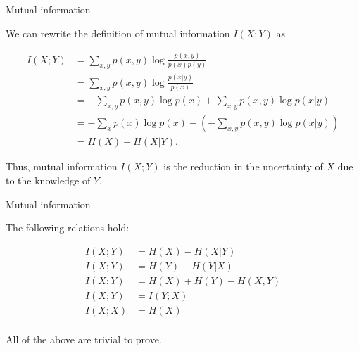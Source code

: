\documentclass[11pt,compress,t,notes=noshow, xcolor=table]{beamer}
\begin{document}
\begin{vbframe} {Mutual information}

We can rewrite the definition of mutual information $I(X;Y)$ as

\begin{equation*}\begin{aligned}
I(X ; Y) &=\sum_{x, y} p(x, y) \log \frac{p(x, y)}{p(x) p(y)} \\
&=\sum_{x, y} p(x, y) \log \frac{p(x | y)}{p(x)} \\
&=-\sum_{x, y} p(x, y) \log p(x)+\sum_{x, y} p(x, y) \log p(x | y) \\
&=-\sum_{x} p(x) \log p(x)-\left(-\sum_{x, y} p(x, y) \log p(x | y)\right) \\
&=H(X)-H(X | Y).
\end{aligned}\end{equation*}

Thus, mutual information $I(X;Y)$ is the reduction in the uncertainty
of $X$ due to the knowledge of $Y$.

\end{vbframe}

\begin{vbframe} {Mutual information}

The following relations hold:

\begin{equation*}
\begin{aligned}
I(X ; Y) &= H(X) - H(X | Y) \\
I(X ; Y) &= H(Y) - H(Y | X) \\
I(X ; Y) &= H(X) + H(Y) - H(X, Y) \\
I(X ; Y) &= I(Y ; X) \\
I(X ; X) &= H(X)\\
\end{aligned}
\end{equation*}

All of the above are trivial to prove.


\end{vbframe}
\end{document}
